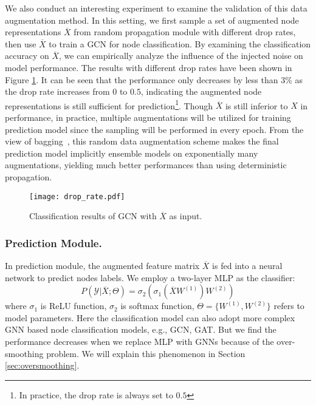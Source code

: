 {We also conduct an interesting experiment to examine the validation of this data augmentation method. In this setting, we first sample a set of augmented node representations $\overline{X}$ from random propagation module with different drop rates, then use $\overline{X}$ to train a GCN for node classification. 
By examining the classification accuracy on $\overline{X}$, we can empirically analyze the influence of the injected noise on model performance. The results with different drop rates have been shown in Figure \ref{fig:redundancy}. It can be seen that the performance only decreases by less than $3\%$ as the drop rate increases from $0$ to $0.5$, indicating the augmented node representations is still sufficient for prediction\footnote{In practice, the drop rate is always set to $0.5$}. 
 Though $\overline{X}$  is still inferior to $X$ in performance, in practice, multiple augmentations will be utilized for training prediction model since the sampling will be performed in every epoch. From the view of bagging~\cite{breiman1996bagging}, this random data augmentation scheme makes the final prediction model implicitly ensemble models on exponentially many augmentations, yielding much better performances than using deterministic propagation.
 
  


\begin{figure}
  		\centering
  		\texttt{[image: drop\_rate.pdf]}
  	\caption{Classification results of GCN with $\overline{X}$ as input.} 
  	\label{fig:redundancy}
\end{figure}
  






\subsubsection{Prediction Module.}
In prediction module, the augmented feature matrix $\overline{X}$ is fed into a neural network to predict nodes labels. We employ a two-layer MLP as the classifier:
\begin{equation}
\label{equ:mlp}
    P(\mathcal{Y}|\overline{X};\Theta) = \sigma_2(\sigma_1(\overline{X}W^{(1)})W^{(2)})
\end{equation}
where $\sigma_1$ is ReLU function, $\sigma_2$ is softmax function, $\Theta=\{W^{(1)}, W^{(2)}\}$ refers to model parameters. Here the classification model can also adopt more complex GNN based node classification models, e.g., GCN, GAT.  But we find the performance decreases when we replace MLP with GNNs because of the over-smoothing problem. We will explain this phenomenon in Section \ref{sec:oversmoothing}.






}

